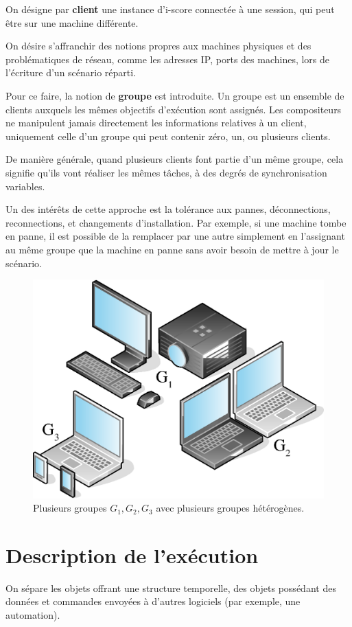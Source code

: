 \documentclass{article}
\newcommand\vocab[1]{\textbf{#1}}
\begin{document}
On désigne par \vocab{client} une instance d'i-score connectée à une session, qui peut être sur une machine différente.

On désire s'affranchir des notions propres aux machines physiques et des problématiques de réseau, comme les adresses IP, ports des machines, lors de l'écriture d'un scénario réparti. 

Pour ce faire, la notion de \vocab{groupe} est introduite. 
Un groupe est un ensemble de clients auxquels les mêmes objectifs d'exécution sont assignés.
Les compositeurs ne manipulent jamais directement les informations relatives à un client, uniquement celle d'un groupe qui peut contenir zéro, un, ou plusieurs clients.

De manière générale, quand plusieurs clients font partie d'un même groupe, cela signifie qu'ils vont réaliser les mêmes tâches, à des degrés de synchronisation variables.

Un des intérêts de cette approche est la tolérance aux pannes, déconnections, reconnections, et changements d'installation. 
Par exemple, si une machine tombe en panne, il est possible de la remplacer par une autre simplement en l'assignant au même groupe que la machine en panne 
sans avoir besoin de mettre à jour le scénario.


\begin{figure}[h]
	\centering
	\includegraphics[scale=0.4]{images/groupes.eps}
	\caption{Plusieurs groupes $G_1,G_2,G_3$ avec plusieurs groupes hétérogènes.}
	\label{img.groupes}
\end{figure}


\section{Description de l'exécution}\label{sec.description}
On sépare les objets offrant une structure temporelle, des objets possédant des données et commandes envoyées à d'autres logiciels (par exemple, une automation).
\end{document}
